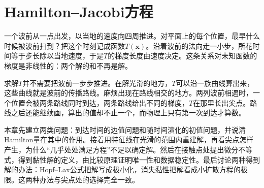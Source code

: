 \chapter{Hamilton--Jacobi方程}
\label{chap:hamilton-jacobi-equations}

一个波前从一点出发，以当地的速度向四周推进。对平面上的每个位置，最早什么时候被波前扫到？把这个时刻记成函数$T(\bm{x})$。沿着波前的法向走一小步，所花时间等于步长除以当地速度，于是$T$的梯度长度由速度决定。这条关系对未知函数的梯度是非线性的：两个解的和不再是解。

求解$T$并不需要把波前一步步推进。在解光滑的地方，$T$可以沿一族曲线算出来，这些曲线就是波前的传播路线。麻烦出现在路线相交的地方。两列波前相遇时，一个位置会被两条路线同时到达，两条路线给出不同的梯度，$T$在那里长出尖点。路线之后还能继续画，算出的值却不止一个，而物理上只有第一次到达才算数。

本章先建立两类问题：到达时间的边值问题和随时间演化的初值问题，并说清Hamilton量在其中的作用。接着用特征线在光滑的范围内重建解，再看尖点怎样产生，为什么“几乎处处满足方程”不足以确定解。然后在接触点处提出微分不等式，得到黏性解的定义，由比较原理证明唯一性和数据稳定性。最后讨论两种得到解的办法：Hopf--Lax公式把解写成极小化，消失黏性把解看成小扩散方程的极限。这两种办法与尖点处的选择完全一致。









